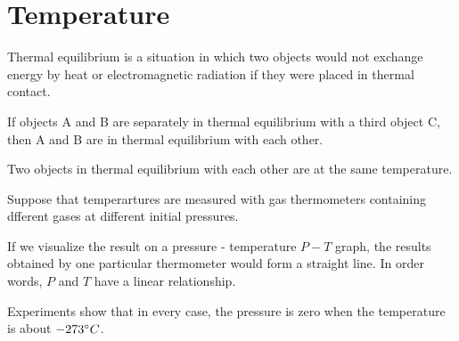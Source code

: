 \chapter{Temperature}

        \par Thermal equilibrium is a situation in which two objects would not exchange
        energy by heat or electromagnetic radiation if they were placed in thermal
        contact.
        \par If objects A and B are separately in thermal equilibrium with a third object
        C, then A and B are in thermal equilibrium with each other.
        \par Two objects in thermal equilibrium with each other are at the same
        temperature.

        \par Suppose that temperartures are measured with gas thermometers containing
        dfferent gases at different initial pressures.
        \par If we visualize the result on a pressure - temperature $P-T$ graph, the
        results obtained by one particular thermometer would form a straight line.
        In order words, $P$ and $T$ have a linear relationship.
        \par Experiments show that in every case, the pressure is zero when the
        temperature is about $-273 \degree C$.

